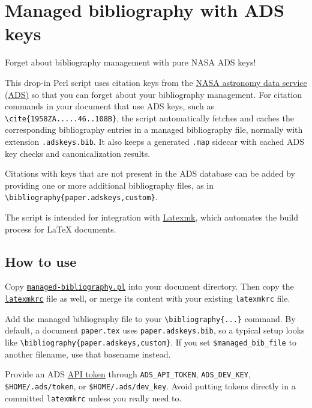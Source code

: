 \section{Managed bibliography with ADS
keys}\label{managed-bibliography-with-ads-keys}

Forget about bibliography management with pure NASA ADS keys!

This drop-in Perl script uses citation keys from the
\href{https://ui.adsabs.harvard.edu/}{NASA astronomy data service (ADS)}
so that you can forget about your bibliography management. For citation
commands in your document that use ADS keys, such as
\texttt{\textbackslash{}cite\{1958ZA.....46..108B\}}, the script
automatically fetches and caches the corresponding bibliography entries
in a managed bibliography file, normally with extension
\texttt{.adskeys.bib}. It also keeps a generated \texttt{.map} sidecar
with cached ADS key checks and canonicalization results.

Citations with keys that are not present in the ADS database can be
added by providing one or more additional bibliography files, as in
\texttt{\textbackslash{}bibliography\{paper.adskeys,custom\}}.

The script is intended for integration with
\href{https://ctan.org/pkg/latexmk/}{Latexmk}, which automates the build
process for LaTeX documents.

\subsection{How to use}\label{how-to-use}

Copy \href{./managed-bibliography.pl}{\texttt{managed-bibliography.pl}}
into your document directory. Then copy the
\href{./latexmkrc}{\texttt{latexmkrc}} file as well, or merge its
content with your existing \texttt{latexmkrc} file.

Add the managed bibliography file to your
\texttt{\textbackslash{}bibliography\{...\}} command. By default, a
document \texttt{paper.tex} uses \texttt{paper.adskeys.bib}, so a
typical setup looks like
\texttt{\textbackslash{}bibliography\{paper.adskeys,custom\}}. If you
set \texttt{\$managed\_bib\_file} to another filename, use that basename
instead.

Provide an ADS \href{https://ui.adsabs.harvard.edu/help/api/}{API token}
through \texttt{ADS\_API\_TOKEN}, \texttt{ADS\_DEV\_KEY},
\texttt{\$HOME/.ads/token}, or \texttt{\$HOME/.ads/dev\_key}. Avoid
putting tokens directly in a committed \texttt{latexmkrc} unless you
really need to.


